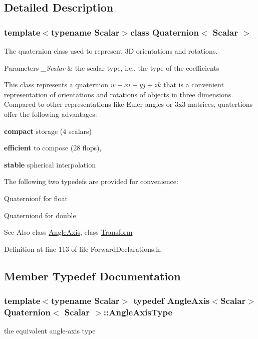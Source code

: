 \subsection{Detailed Description}
\subsubsection*{template$<$typename Scalar$>$class Quaternion$<$ Scalar $>$}

The quaternion class used to represent 3\-D orientations and rotations. 


\begin{DoxyParams}{Parameters}
{\em \-\_\-\-Scalar} & the scalar type, i.\-e., the type of the coefficients\\
\hline
\end{DoxyParams}
This class represents a quaternion $ w+xi+yj+zk $ that is a convenient representation of orientations and rotations of objects in three dimensions. Compared to other representations like Euler angles or 3x3 matrices, quatertions offer the following advantages\-: \begin{DoxyItemize}
\item {\bfseries compact} storage (4 scalars) \item {\bfseries efficient} to compose (28 flops), \item {\bfseries stable} spherical interpolation\end{DoxyItemize}
The following two typedefs are provided for convenience\-: \begin{DoxyItemize}
\item {\ttfamily Quaternionf} for {\ttfamily float} \item {\ttfamily Quaterniond} for {\ttfamily double} \end{DoxyItemize}
\begin{DoxySeeAlso}{See Also}
class \hyperlink{class_angle_axis}{Angle\-Axis}, class \hyperlink{class_transform}{Transform} 
\end{DoxySeeAlso}


Definition at line 113 of file Forward\-Declarations.\-h.



\subsection{Member Typedef Documentation}
\hypertarget{class_quaternion_a9669c6f15433959ede73917adff4ce53}{
\subsubsection[{Angle\-Axis\-Type}]{\setlength{\rightskip}{0pt plus 5cm}template$<$typename Scalar$>$ typedef {\bf Angle\-Axis}$<${\bf Scalar}$>$ {\bf Quaternion}$<$ {\bf Scalar} $>$\-::{\bf Angle\-Axis\-Type}}}\label{class_quaternion_a9669c6f15433959ede73917adff4ce53}
the equivalent angle-\/axis type 

